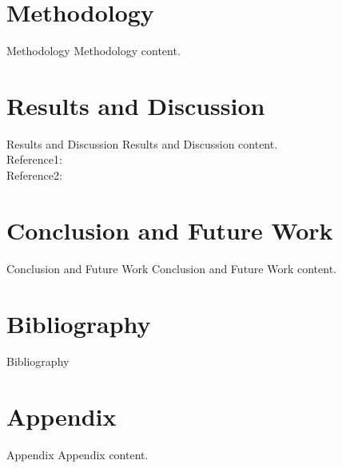 \documentclass[10pt]{beamer}
\newenvironment{tres important}[2][]{
	\setkeys{EmphEqEnv}{#2}
	\setkeys{EmphEqOpt}{box={\setlength{\fboxsep}{10pt}\fcolorbox{myNewColorA}{white}},#1}
	\EmphEqMainEnv}
{\endEmphEqMainEnv}
\begin{document}
\section{Methodology}
\begin{frame}{Methodology}
    Methodology content.
\end{frame}

\section{Results and Discussion}
\begin{frame}{Results and Discussion}
    Results and Discussion content. \\
    Reference1: \cite{brandimarte2013numerical} \\
    Reference2: \cite{carmona2012numerical}
\end{frame}

\section{Conclusion and Future Work}
\begin{frame}{Conclusion and Future Work}
    Conclusion and Future Work content.
\end{frame}

\section{Bibliography}
\begin{frame}{Bibliography}
    
    
\end{frame}

\section{Appendix}
\begin{frame}{Appendix}
    Appendix content.
\end{frame}
\end{document}

